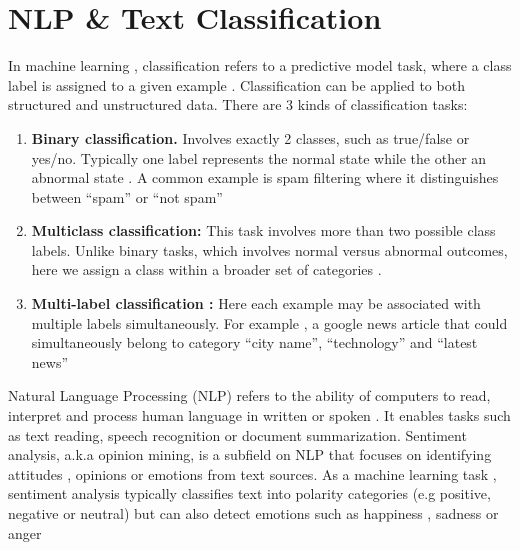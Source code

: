 \section{NLP \& Text Classification}
\label{sec:background:nlp_text_classification}
In machine learning , classification refers to a predictive model task, where a class label is assigned to a given example \cite{sarker:2021} . Classification can be applied to both structured and unstructured data. There are 3 kinds of classification tasks:

\begin{enumerate}
  \item \textbf{Binary classification.} Involves exactly 2 classes, such as true/false or yes/no. Typically one label represents the normal state while the other an abnormal state \cite{han:2011}. A common example is spam filtering where it distinguishes between “spam” or “not spam”
  \item \textbf{ Multiclass classification:} This task involves more than two possible class labels. Unlike binary tasks, which involves normal versus abnormal outcomes, here we assign a class within a broader set of categories .
  \item \textbf{Multi-label classification :} Here each example may be associated with multiple labels simultaneously. For example , a google news article that could simultaneously  belong to category “city name”, “technology” and “latest news”
\end{enumerate}

Natural Language Processing (NLP) refers to the ability of computers to read, interpret and process human language in written or spoken  \cite{otter:2021} . It enables tasks such as text reading, speech recognition or document summarization. Sentiment analysis, a.k.a opinion mining, is a subfield on NLP that focuses on identifying attitudes , opinions or emotions from text sources. As a machine learning task , sentiment analysis typically classifies text into polarity categories (e.g positive, negative or neutral) but can also detect emotions such as happiness , sadness or anger \cite{ravi:2015}
